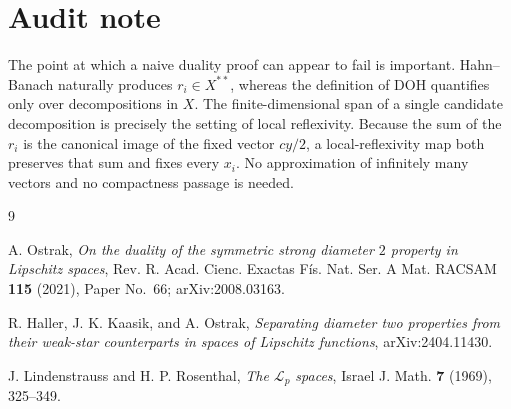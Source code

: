 \documentclass[11pt]{article}
\newcommand{\DOH}{\mathrm{DOH}}
\begin{document}
\section{Audit note}

The point at which a naive duality proof can appear to fail is important.
Hahn--Banach naturally produces $r_i\in X^{**}$, whereas the definition of
$\DOH$ quantifies only over decompositions in $X$.  The finite-dimensional
span of a single candidate decomposition is precisely the setting of local
reflexivity.  Because the sum of the $r_i$ is the canonical image of the
fixed vector $cy/2$, a local-reflexivity map both preserves that sum and
fixes every $x_i$.  No approximation of infinitely many vectors and no
compactness passage is needed.

\begin{thebibliography}{9}

A. Ostrak,
\emph{On the duality of the symmetric strong diameter $2$ property in
Lipschitz spaces},
Rev. R. Acad. Cienc. Exactas F\'is. Nat. Ser. A Mat. RACSAM
\textbf{115} (2021), Paper No.~66;
arXiv:2008.03163.

R. Haller, J. K. Kaasik, and A. Ostrak,
\emph{Separating diameter two properties from their weak-star counterparts
in spaces of Lipschitz functions},
arXiv:2404.11430.

J. Lindenstrauss and H. P. Rosenthal,
\emph{The $\mathcal L_p$ spaces},
Israel J. Math. \textbf{7} (1969), 325--349.

\end{thebibliography}
\end{document}
